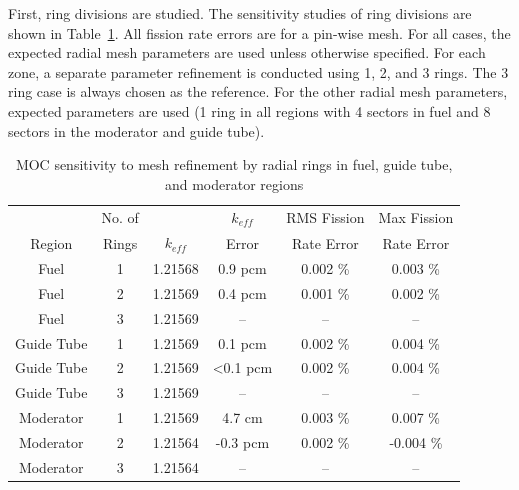 

First, ring divisions are studied. The sensitivity studies of ring divisions are shown in Table~\ref{tab:ring-sensitivity}. All fission rate errors are for a pin-wise mesh. For all cases, the expected radial mesh parameters are used unless otherwise specified. For each zone, a separate parameter refinement is conducted using 1, 2, and 3 rings. The 3 ring case is always chosen as the reference. For the other radial mesh parameters, expected parameters are used (1 ring in all regions with 4 sectors in fuel and 8 sectors in the moderator and guide tube).

\begin{table}[ht]
	\centering
	\caption{MOC sensitivity to mesh refinement by radial rings in fuel, guide tube, and moderator regions}
	\medskip
	\begin{tabular}{c|c|c|c|c|c}
		\hline
		 & No. of  & & $k_{\textit{eff}}$ & \ac{RMS} Fission & Max Fission \\
		Region  & Rings & $k_{\textit{eff}}$ & Error & Rate Error & Rate Error \\
		\hline
		Fuel & 1 & 1.21568 & 0.9 pcm  & 0.002 \% & 0.003 \% \\
		Fuel & 2 & 1.21569 & 0.4 pcm  & 0.001 \% & 0.002 \% \\
		Fuel & 3 & 1.21569 & -- & -- & -- \\
		\hline
		\hline
		Guide Tube & 1 & 1.21569 & 0.1 pcm & 0.002 \% & 0.004 \% \\
		Guide Tube & 2 & 1.21569 & <0.1 pcm  & 0.002 \% & 0.004 \% \\
		Guide Tube & 3 & 1.21569 & -- & -- & -- \\
		\hline
		\hline
		Moderator & 1 & 1.21569 & 4.7 cm  & 0.003 \% & 0.007 \% \\
		Moderator & 2 & 1.21564 & -0.3 pcm  & 0.002 \% & -0.004 \% \\
		Moderator & 3 & 1.21564 & -- & -- & -- \\
		\hline
	\end{tabular}
	\label{tab:ring-sensitivity}
\end{table}

